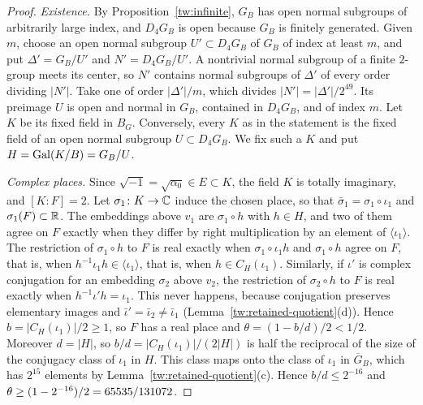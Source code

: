 \begin{proof}
\emph{Existence.} By Proposition~\ref{tw:infinite}, $G_B$ has open normal
subgroups of arbitrarily large index, and $D_4G_B$ is open because $G_B$ is
finitely generated. Given $m$, choose an open normal subgroup
$U'\subset D_4G_B$ of $G_B$ of index at least $m$, and put $\Delta'=G_B/U'$
and $N'=D_4G_B/U'$. A nontrivial normal subgroup of a finite $2$-group meets
its center, so $N'$ contains normal subgroups of $\Delta'$ of every order
dividing $|N'|$. Take one of order $|\Delta'|/m$, which divides
$|N'|=|\Delta'|/2^{49}$. Its preimage $U$ is open and normal in $G_B$,
contained in $D_4G_B$, and of index $m$. Let $K$ be its fixed field in $B_G$.
Conversely, every $K$ as in the statement is the fixed field of an open
normal subgroup $U\subset D_4G_B$. We fix such a $K$ and put
$H=\operatorname{Gal}(K/B)=G_B/U$.

\emph{Complex places.} Since $\sqrt{-1}=\sqrt{\alpha_0}\in E\subset K$, the
field $K$ is totally imaginary, and $[K:F]=2$. Let $\sigma_1\colon K\to\mathbb C$
induce the chosen place, so that $\bar\sigma_1=\sigma_1\circ\iota_1$ and
$\sigma_1(F)\subset\mathbb R$. The embeddings above $v_1$ are $\sigma_1\circ h$ with
$h\in H$, and two of them agree on $F$ exactly when they differ by right
multiplication by an element of $\langle\iota_1\rangle$. The restriction of
$\sigma_1\circ h$ to $F$ is real exactly when $\sigma_1\circ\iota_1h$ and
$\sigma_1\circ h$ agree on $F$, that is, when
$h^{-1}\iota_1h\in\langle\iota_1\rangle$, that is, when
$h\in C_H(\iota_1)$. Similarly, if $\iota'$ is complex conjugation for an
embedding $\sigma_2$ above $v_2$, the restriction of $\sigma_2\circ h$ to $F$
is real exactly when $h^{-1}\iota'h=\iota_1$. This never happens, because
conjugation preserves elementary images and $\bar\iota'=\bar\iota_2\ne\bar\iota_1$
(Lemma~\ref{tw:retained-quotient}(d)). Hence $b=|C_H(\iota_1)|/2\ge1$, so $F$
has a real place and $\theta=(1-b/d)/2<1/2$. Moreover $d=|H|$, so
$b/d=|C_H(\iota_1)|/(2|H|)$ is half the reciprocal of the size of the
conjugacy class of $\iota_1$ in $H$. This class maps onto the class of
$\iota_1$ in $\overline G_B$, which has $2^{15}$ elements by
Lemma~\ref{tw:retained-quotient}(c). Hence $b/d\le2^{-16}$ and
$\theta\ge(1-2^{-16})/2=65535/131072$.


\end{proof}
